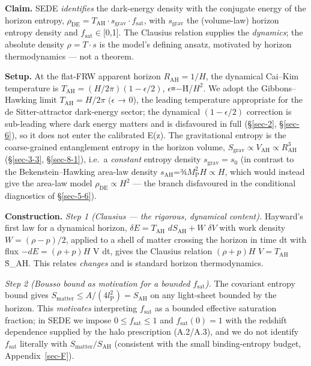 \documentclass[preprint,12pt]{elsarticle}
\begin{document}
\textbf{Claim.} SEDE \emph{identifies} the dark-energy density with the
conjugate energy of the horizon entropy,
\(\rho _\mathrm{DE} = T_\mathrm{AH}\cdot s_{\mathrm{grav}}\cdot f_{\mathrm{sat}}\),
with \(s_{\mathrm{grav}}\) the (volume-law) horizon entropy density and
\(f_{\mathrm{sat}} \in  [0\),1{]}. The Clausius relation supplies the
\emph{dynamics}; the absolute density \(\rho  = T\cdot s\) is the
model's defining ansatz, motivated by horizon thermodynamics --- not a
theorem.

\textbf{Setup.} At the flat-FRW apparent horizon
\(R_\mathrm{AH} = 1/H\), the dynamical Cai--Kim temperature is
\(T_\mathrm{AH} = (H/2\pi )(1 - \epsilon /2)\),
\(\epsilon\)≡−Ḣ/\(H^{2}\). We adopt the Gibbons--Hawking limit
\(T_\mathrm{AH} = H/2\pi\) \((\epsilon\) → 0), the leading temperature
appropriate for the de Sitter-attractor dark-energy sector; the
dynamical \((1 - \epsilon /2)\) correction is sub-leading where dark
energy matters and is disfavoured in full (§\ref{sec-2}, §\ref{sec-6}),
so it does not enter the calibrated E(z). The gravitational entropy is
the coarse-grained entanglement entropy in the horizon volume,
\(S_{\mathrm{grav}} \propto  V_\mathrm{AH} \propto  R_\mathrm{AH}^{3}\)
(§\ref{sec-3-3}, §\ref{sec-8-1}), i.e.~a \emph{constant} entropy density
\(s_{\mathrm{grav}} = s_{0}\) (in contrast to the Bekenstein--Hawking
area-law density \(s_\mathrm{AH}\)=¾\(M_{\mathrm{P}}^{2}H \propto  H\),
which would instead give the area-law model
\(\rho _\mathrm{DE} \propto  H^{2}\) --- the branch disfavoured in the
conditional diagnostics of §\ref{sec-5-6}).

\textbf{Construction.} \emph{Step 1 (Clausius --- the rigorous,
dynamical content).} Hayward's first law for a dynamical horizon,
\(\delta E = T_\mathrm{AH}\) \(dS_\mathrm{AH} + W\) \(\delta V\) with
work density \(W = (\rho  - p)/2\), applied to a shell of matter
crossing the horizon in time dt with flux \(-dE = (\rho  + p)H\) V dt,
gives the Clausius relation \((\rho  + p)H\) \(V = T_\mathrm{AH}\)
Ṡ\_AH. This relates \emph{changes} and is standard horizon
thermodynamics.

\emph{Step 2 (Bousso bound as motivation for a bounded
\(f_{\mathrm{sat}}\)).} The covariant entropy bound gives
\(S_{\mathrm{matter}} \leq  A/(4l_{\mathrm{P}}^{2}) = S_\mathrm{AH}\) on
any light-sheet bounded by the horizon. This \emph{motivates}
interpreting \(f_{\mathrm{sat}}\) as a bounded effective saturation
fraction; in SEDE we impose \(0 \leq  f_{\mathrm{sat}} \leq  1\) and
\(f_{\mathrm{sat}}(0) = 1\) with the redshift dependence supplied by the
halo prescription (A.2/A.3), and we do not identify \(f_{\mathrm{sat}}\)
literally with \(S_{\mathrm{matter}}/S_\mathrm{AH}\) (consistent with
the small binding-entropy budget, Appendix~\ref{sec-F}).
\end{document}

